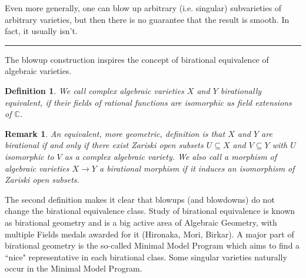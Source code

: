 \documentclass[11pt]{article}
\numberwithin{equation}{section}
\numberwithin{footnote}{section}
\newtheorem{defn}[thm]{Definition}
\newtheorem{rem}[thm]{Remark}
\newcommand{\blue}{\color{blue}}
\newcommand{\C}{{\mathbb C}}
\begin{document}
\smallskip
Even more generally, one can blow up arbitrary (i.e. singular) subvarieties of arbitrary varieties, but then there is no guarantee that the result is smooth. In fact, it usually isn't.

\smallskip
{\blue \hrule}

The blowup construction inspires the concept of {\blue birational equivalence} of algebraic varieties.

\smallskip
\begin{defn}
We call complex algebraic varieties $X$ and $Y$ birationally equivalent, if their fields of rational functions are isomorphic as field extensions of $\C$.
\end{defn}

\smallskip
\begin{rem}
An equivalent, more geometric, definition is that $X$ and $Y$ are birational if and only if there exist Zariski open subsets
$U\subseteq X$ and $V\subseteq Y$ with $U$ isomorphic to $V$ as a complex algebraic variety. We also call a morphism of algebraic varieties $X\to Y$ a birational morphism if it induces an isomorphism of Zariski open subsets.
\end{rem}

The second definition makes it clear that blowups (and blowdowns) do not change the birational equivalence class.
Study of birational equivalence is known as {\blue birational geometry} and is a big active area of Algebraic Geometry, with multiple Fields medals awarded for it (Hironaka, Mori, Birkar). A major part of birational geometry is the so-called Minimal Model Program
which aims to find a ``nice" representative in each birational class. Some singular varieties naturally occur in the Minimal Model Program.
\end{document}

